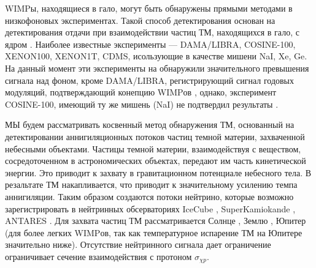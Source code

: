 WIMPы, находящиеся в гало, могут быть обнаружены прямыми методами в низкофоновых экспериментах. Такой способ детектирования основан на детектирования отдачи при взаимодействии частиц ТМ, находящихся в гало, с ядром \cite{Schumann_2019}. Наиболее известные эксперименты --- DAMA/LIBRA, COSINE-100, XENON100, XENON1T, CDMS, исользующие в качестве мишени NaI, Xe, Ge. На данный момент эти эксперименты на обнаружили значительного превышения сигнала над фоном, кроме DAMA/LIBRA, регистрирующий сигнал годовых модуляций, подтверждающий конепцию WIMPов \cite{Bernabei_2018}, однако, эксперимент COSINE-100, имеющий ту же мишень (NaI)  не подтвердил результаты \cite{Adhikari_2022}.

МЫ будем рассматривать косвенный метод обнаружения ТМ, основанный на детектировании аннигиляционных потоков частиц темной материи, захваченной небесными объектами. Частицы темной материи, взаимодействуя с веществом, сосредоточенном в астрономических объектах, передают им часть кинетической энергии. Это приводит к захвату в гравитационном потенциале небесного тела. В резальтате ТМ накапливается, что приводит к значительному усилению темпа аннигиляции. Таким образом создаются потоки нейтрино, которые возможно зарегистрировать в нейтринных обсерваториях  IceCube \cite{Aartsen_2017}, SuperKamiokande \cite{kamiokandecollaboration2015search}, ANTARES \cite{ADRIANMARTINEZ201669}. Для захвата частиц ТМ рассматривается Солнце \cite{1985ApJ...296..679P}, Землю \cite{1987ApJ...321..571G}, Юпитер \cite{10.1103/physrevd.106.115037} (для более легких WIMPов, так как температурное испарение ТМ на Юпитере значительно ниже). Отсутствие нейтринного сигнала дает ограничение ограничивает сечение взаимодействия с протоном $\sigma_{\chi p}$.

